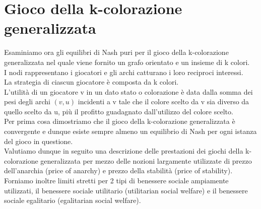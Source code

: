 \chapter{Gioco della k-colorazione generalizzata}
\justify
Esaminiamo ora gli equilibri di Nash puri per il gioco della k-colorazione generalizzata nel quale viene fornito un grafo orientato e un insieme di k colori.\\
I nodi rappresentano i giocatori e gli archi catturano i loro reciproci interessi.\\
La strategia di ciascun giocatore è composta da k colori.\\
L'utilità di un giocatore v in un dato stato o colorazione è data dalla somma dei pesi degli archi \((v, u)\) incidenti a v tale che il colore scelto da v sia diverso da quello scelto da u, più il profitto guadagnato dall'utilizzo del colore scelto.\\
Per prima cosa dimostriamo che il gioco della k-colorazione generalizzata è convergente e dunque esiste sempre almeno un equilibrio di Nash per ogni istanza del gioco in questione.\\
Valutiamo dunque in seguito una descrizione delle prestazioni dei giochi della k-colorazione generalizzata per mezzo delle nozioni largamente utilizzate di prezzo dell'anarchia (price of anarchy) e prezzo della stabilità (price of stability).\\
Forniamo inoltre limiti stretti per 2 tipi di benessere sociale ampiamente utilizzati, il benessere sociale utilitario (utilitarian social welfare) e il benessere sociale egalitario (egalitarian social welfare).\newline

